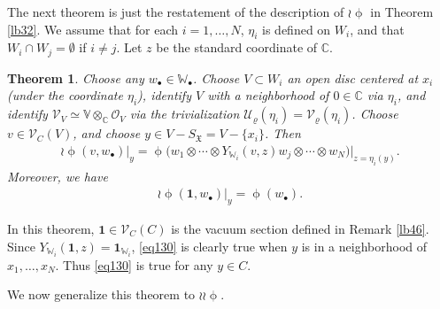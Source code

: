 \documentclass[12pt,a4paper,notitlepage]{report}
\theoremstyle{definition}
\theoremstyle{plain}
\newtheorem{thm}[df]{Theorem}
\newcommand{\fk}{\mathfrak}
\newcommand{\mc}{\mathcal}
\newcommand{\id}{\mathbf{1}}
\newcommand{\scr}{\mathscr}
\newcommand{\blt}{\bullet}
\newcommand{\Vbb}{\mathbb V}
\newcommand{\Wbb}{\mathbb W}
\newcommand{\Cbb}{\mathbb C}
\numberwithin{equation}{section}
\begin{document}
The next theorem is just the restatement of the description of $\wr\upphi$ in Theorem \ref{lb32}. We assume that for each $i=1,\dots,N$, $\eta_i$ is defined on $W_i$, and that $W_i\cap W_j=\emptyset$ if $i\neq j$. Let $z$ be the standard coordinate of $\Cbb$.
\begin{thm}\label{lb47}
Choose any  $w_\blt\in\Wbb_\blt$.  Choose $V\subset W_i$ an open disc centered at $x_i$ (under the coordinate $\eta_i$), identify $V$ with a neighborhood of $0\in\Cbb$ via $\eta_i$, and identify $\scr V_V\simeq \Vbb\otimes_\Cbb\scr O_V$ via the trivialization $\mc U_\varrho(\eta_i)=\mc V_\varrho(\eta_i)$. Choose $v\in\scr V_C(V)$, and choose  $y\in V-S_{\fk X}=V-\{x_i\}$. Then
\begin{align}
\wr\upphi(v,w_\blt)\big|_y=\upphi\big(w_1\otimes\cdots\otimes Y_{\Wbb_i}(v,z)w_j\otimes\cdots\otimes w_N\big)\big|_{z=\eta_i(y)}.
\end{align}
Moreover, we have
\begin{align}
\wr\upphi(\id,w_\blt)|_y=\upphi(w_\blt).\label{eq130}
\end{align}
\end{thm}

In this theorem, $\id\in \scr V_C(C)$ is the vacuum section defined in Remark \ref{lb46}. Since $Y_{\Wbb_i}(\id,z)=\id_{\Wbb_i}$, \eqref{eq130} is clearly true when $y$ is in a neighborhood of $x_1,\dots,x_N$. Thus \eqref{eq130} is true for any $y\in C$.


We now generalize this theorem to $\wr\wr\upphi$. 
\end{document}
